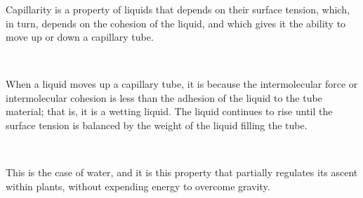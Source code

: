 \begin{frame}
	\frametitle{\secname}
	\begin{center}\Huge %
	\end{center}
\end{frame}
\begin{frame}
	\frametitle{\secname}
	Capillarity is a \alert{property of liquids} that depends on their
	surface tension, which, in turn, depends on the cohesion of the
	liquid, and which gives it the ability to move up or down a
	capillary tube.

	\

	When a liquid moves up a capillary tube, it is because the
	intermolecular force or \alert{intermolecular cohesion} is less than the
	adhesion of the liquid to the tube material; that is, it is a
	wetting liquid.
	The liquid continues to rise until the surface tension is balanced
	by the weight of the liquid filling the tube.

	\

	This is the case of \alert{water}, and it is this property that
	partially regulates its ascent within plants, without expending
	energy to overcome gravity.
\end{frame}

